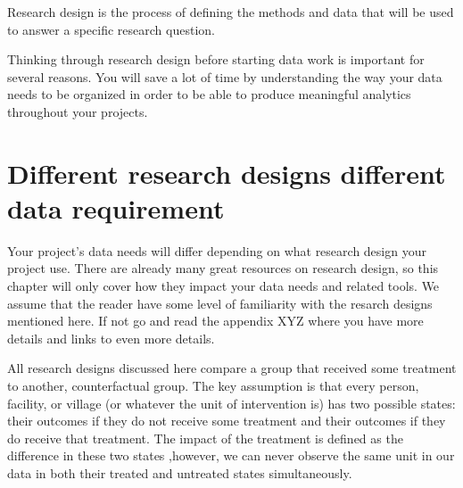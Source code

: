
\begin{fullwidth}
Research design is the process of defining the methods and data
that will be used to answer a specific research question.


Thinking through research design before starting data work is important for several reasons. You will save a lot of time by understanding the way
your data needs to be organized
in order to be able to produce meaningful analytics throughout your projects.




\end{fullwidth}


\section{Different research designs different data requirement }

Your project's data needs will differ depending on what research design your project use. 
There are already many great resources on research design,
so this chapter will only cover how they impact your data needs and related tools. 
We assume that the reader have some level of familiarity with the resarch designs mentioned here. 
If not go and read the appendix XYZ where you have more details and links to even more details.  

All research designs discussed here compare a group that received some treatment
 to another, counterfactual group.
The key assumption is that every
person, facility, or village (or whatever the unit of intervention is)
has two possible states: their outcomes if they do not receive some treatment
and their outcomes if they do receive that treatment.
The impact of the treatment is defined as the difference in these two states
,however, we can never observe the same unit in our data
in both their treated and untreated states simultaneously.

